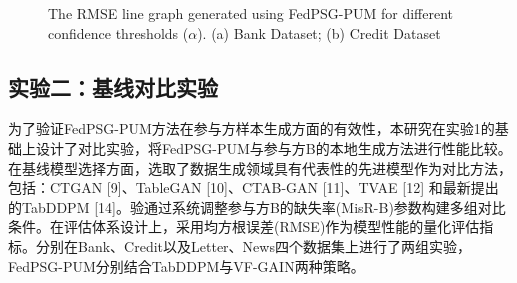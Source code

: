 \begin{figure}[!h]
	\centering
	\hspace{0.01\textwidth}  %
	
	{\centering \wuhao The RMSE line graph generated using FedPSG-PUM for different confidence thresholds ($\alpha$). (a) Bank Dataset; (b) Credit Dataset}    
	\label{Chapter4Exp1Setting3}
\end{figure}


\subsection{实验二：基线对比实验}
为了验证FedPSG-PUM方法在参与方样本生成方面的有效性，本研究在实验1的基础上设计了对比实验，将FedPSG-PUM与参与方B的本地生成方法进行性能比较。在基线模型选择方面，选取了数据生成领域具有代表性的先进模型作为对比方法，包括：CTGAN [9]、TableGAN [10]、CTAB-GAN [11]、TVAE [12] 和最新提出的TabDDPM [14]。验通过系统调整参与方B的缺失率(MisR-B)参数构建多组对比条件。在评估体系设计上，采用均方根误差(RMSE)作为模型性能的量化评估指标。分别在Bank、Credit以及Letter、News四个数据集上进行了两组实验，FedPSG-PUM分别结合TabDDPM与VF-GAIN两种策略。

